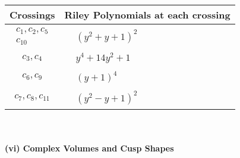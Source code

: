 \documentclass[1p]{elsarticle_modified}
\theoremstyle{definition}
\begin{document}
\begin{tabular}{m{50pt}|m{274pt}}
Crossings & \hspace{64pt}Riley Polynomials at each crossing \\
\hline $$\begin{aligned}c_{1},c_{2},c_{5}\\c_{10}\end{aligned}$$&$\begin{aligned}
&(y^2+y+1)^2
\end{aligned}$\\
\hline $$\begin{aligned}c_{3},c_{4}\end{aligned}$$&$\begin{aligned}
&y^4+14 y^2+1
\end{aligned}$\\
\hline $$\begin{aligned}c_{6},c_{9}\end{aligned}$$&$\begin{aligned}
&(y+1)^4
\end{aligned}$\\
\hline $$\begin{aligned}c_{7},c_{8},c_{11}\end{aligned}$$&$\begin{aligned}
&(y^2- y+1)^2
\end{aligned}$\\
\hline
\end{tabular}\\~\\
\newpage\flushleft \textbf{(vi) Complex Volumes and Cusp Shapes}
\end{document}
